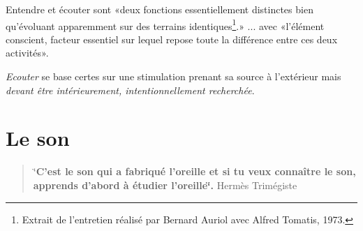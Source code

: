 Entendre et écouter sont «deux
fonctions essentiellement distinctes bien qu'évoluant apparemment sur
des terrains identiques\footnote{Extrait de l'entretien réalisé par
  Bernard Auriol avec Alfred Tomatis, 1973.}.» ... avec «l'élément conscient, facteur essentiel sur lequel repose toute la
différence entre ces deux activités».



\emph{Ecouter} se base certes sur une stimulation prenant sa source à
l'extérieur mais \emph{devant être intérieurement, intentionnellement
  recherchée}.



\section{Le son}
\begin{quotation}
	\char`\"{}\textbf{C'est le son qui a fabriqué l'oreille et si tu veux connaître
	le son, apprends d'abord à étudier l\textquoteright oreille\char`\"{}.}
	Hermès Trimégiste
\end{quotation}

